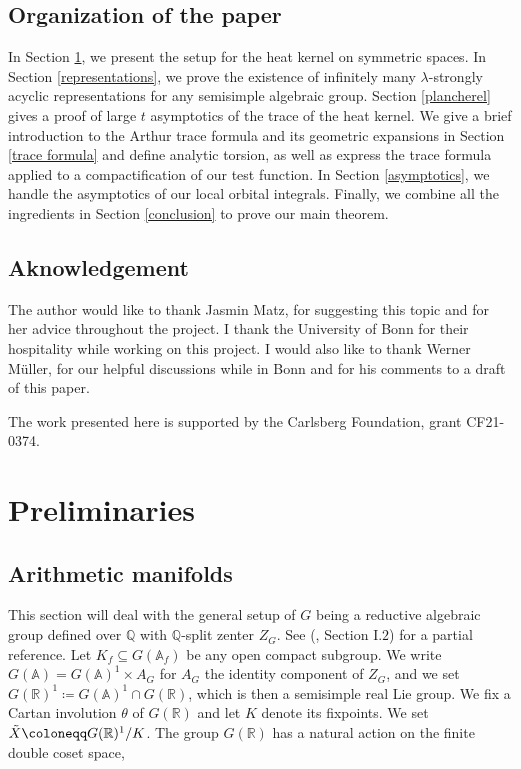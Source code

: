 \documentclass[11pt,reqno]{amsart}
\numberwithin{equation}{section}
\theoremstyle{definition}
\theoremstyle{remark}
\newcommand{\Q}{\mathbb{Q}}
\newcommand{\A}{\mathbb{A}}
\newcommand{\R}{\mathbb{R}}
\renewcommand{\subset}{\subseteq}
\begin{document}
\subsection*{Organization of the paper} 

In Section \ref{definitions}, we present the setup for the heat kernel on symmetric spaces. In Section \ref{representations}, we prove the existence of infinitely many $\lambda$-strongly acyclic representations for any semisimple algebraic group. Section \ref{plancherel} gives a proof of large $t$ asymptotics of the trace of the heat kernel. We give a brief introduction to the Arthur trace formula and its geometric expansions in Section \ref{trace formula} and define analytic torsion, as well as express the trace formula applied to a compactification of our test function. In Section \ref{asymptotics}, we handle the asymptotics of our local orbital integrals. Finally, we combine all the ingredients in Section \ref{conclusion} to prove our main theorem.

\subsection*{Aknowledgement}

The author would like to thank Jasmin Matz, for suggesting this topic and for her advice throughout the project. I thank the University of Bonn for their hospitality while working on this project. I would also like to thank Werner Müller, for our helpful discussions while in Bonn and for his comments to a draft of this paper.

\medskip

\noindent The work presented here is supported by the Carlsberg Foundation, grant CF21-0374.
\bigskip
\bigskip

\section{Preliminaries}\label{definitions}
\subsection*{Arithmetic manifolds}\label{arithmfd}

This section will deal with the general setup of $G$ being a reductive algebraic group defined over $\Q$ with $\Q$-split zenter $Z_G$. See (\cite{Arthur0}, Section I.$2$) for a partial reference.  Let $K_f\subset G(\A_f)$ be any open compact subgroup. We write $G(\A) = G(\A)^1\times A_G$ for $A_G$ the identity component of $Z_G$, and we set $G(\R)^1\coloneqq G(\A)^1\cap G(\R)$, which is then a semisimple real Lie group. We fix a Cartan involution $\theta$ of $G(\R)$ and let $K$ denote its fixpoints. We set $\Tilde{X}\coloneqq G(\R)^1/K$. The group $G(\R)$ has a natural action on the finite double coset space,
\end{document}
